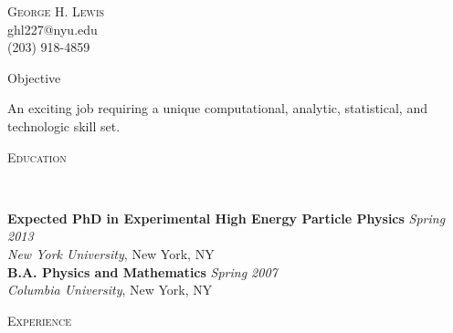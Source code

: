 \documentclass[9pt]{article}
\newenvironment{changemargin}[2]{%
  \begin{list}{}{%
    \setlength{\topsep}{0pt}%
    \setlength{\leftmargin}{#1}%
    \setlength{\rightmargin}{#2}%
    \setlength{\listparindent}{\parindent}%
    \setlength{\itemindent}{\parindent}%
    \setlength{\parsep}{\parskip}%
  }%
  \item[]}{\end{list}
}
\newcommand{\lineover}{
	\begin{changemargin}{-0.05in}{-0.05in}
		\vspace*{-8pt}
		\hrulefill \\
		\vspace*{-2pt}
	\end{changemargin}
}
\newcommand{\header}[1]{
	\begin{changemargin}{-0.5in}{-0.5in}
		\scshape{#1}\\
  	\lineover
	\end{changemargin}
}
\newcommand{\contact}[4]{
	\begin{changemargin}{-0.5in}{-0.5in}
		\begin{center}
			{\Large \scshape {#1}}\\ \smallskip
			{#2}\\ \smallskip 
			{#3}\\ \smallskip
			{#4}\smallskip
		\end{center}
	\end{changemargin}
}
\newenvironment{body} {
	\vspace*{-16pt}
	\begin{changemargin}{-0.25in}{-0.5in}
  }	
	{\end{changemargin}
}
\begin{document}
\contact{George H. Lewis}{ghl227@nyu.edu}{(203) 918-4859}


\header{Objective}
\begin{body}
	\vspace{14pt}
	An exciting job requiring a unique computational, analytic, statistical, and technologic skill set.
\end{body}

\smallskip


\header{Education}

\begin{body}
	\vspace{14pt}
	\textbf{Expected PhD in Experimental High Energy Particle Physics }{} \hfill \emph{Spring 2013}{} \\
	\emph{New York University}, New York, NY{} \\
  \medskip
	\textbf{B.A. Physics and Mathematics} \hfill \emph{Spring 2007} \\
	\emph{Columbia University}, New York, NY\\
\end{body}

\smallskip


\header{Experience}
\end{document}
